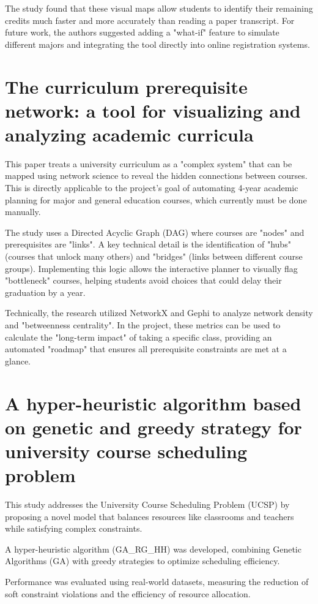 The study found that these visual maps allow students to identify their remaining credits much faster and more accurately than reading a paper transcript. For future work, the authors suggested adding a "what-if" feature to simulate different majors and integrating the tool directly into online registration systems.


\section{The curriculum prerequisite network: a tool for visualizing and analyzing academic curricula \cite{paper_13}}

This paper treats a university curriculum as a "complex system" that can be mapped using network science to reveal the hidden connections between courses. This is directly applicable to the project’s goal of automating 4-year academic planning for major and general education courses, which currently must be done manually.

The study uses a Directed Acyclic Graph (DAG) where courses are "nodes" and prerequisites are "links". A key technical detail is the identification of "hubs" (courses that unlock many others) and "bridges" (links between different course groups). Implementing this logic allows the interactive planner to visually flag "bottleneck" courses, helping students avoid choices that could delay their graduation by a year.

Technically, the research utilized NetworkX and Gephi to analyze network density and "betweenness centrality". In the project, these metrics can be used to calculate the "long-term impact" of taking a specific class, providing an automated "roadmap" that ensures all prerequisite constraints are met at a glance.


\section{A hyper-heuristic algorithm based on genetic and greedy strategy for university course scheduling problem \cite{paper_3}}
This study addresses the University Course Scheduling Problem (UCSP) by proposing a novel model that balances resources like classrooms and teachers while satisfying complex constraints.

A hyper-heuristic algorithm (GA\_RG\_HH) was developed, combining Genetic Algorithms (GA) with greedy strategies to optimize scheduling efficiency.

Performance was evaluated using real-world datasets, measuring the reduction of soft constraint violations and the efficiency of resource allocation.

